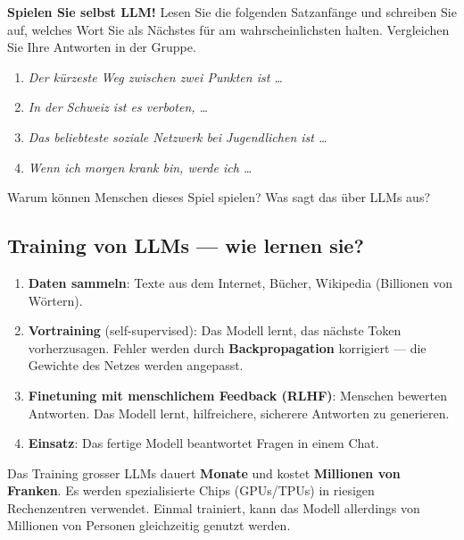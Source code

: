 \begin{myexercise}
\textbf{Spielen Sie selbst LLM!} Lesen Sie die folgenden Satzanfänge und schreiben
Sie auf, welches Wort Sie als Nächstes für am wahrscheinlichsten halten.
Vergleichen Sie Ihre Antworten in der Gruppe.

\begin{enumerate}
    \item \textit{Der kürzeste Weg zwischen zwei Punkten ist \ldots}
    \item \textit{In der Schweiz ist es verboten, \ldots}
    \item \textit{Das beliebteste soziale Netzwerk bei Jugendlichen ist \ldots}
    \item \textit{Wenn ich morgen krank bin, werde ich \ldots}
\end{enumerate}

Warum können Menschen dieses Spiel spielen? Was sagt das über LLMs aus?
\end{myexercise}

\subsection{Training von LLMs --- wie lernen sie?}

\begin{myprocedure}
\begin{enumerate}
    \item \textbf{Daten sammeln}: Texte aus dem Internet, Bücher, Wikipedia
          (Billionen von Wörtern).
    \item \textbf{Vortraining} (self-supervised): Das Modell lernt, das nächste
          Token vorherzusagen. Fehler werden durch \textbf{Backpropagation}
          korrigiert --- die Gewichte des Netzes werden angepasst.
    \item \textbf{Finetuning mit menschlichem Feedback (RLHF)}: Menschen bewerten
          Antworten. Das Modell lernt, hilfreichere, sicherere Antworten zu generieren.
    \item \textbf{Einsatz}: Das fertige Modell beantwortet Fragen in einem Chat.
\end{enumerate}
\end{myprocedure}

\begin{myremark}
Das Training grosser LLMs dauert \textbf{Monate} und kostet \textbf{Millionen von
Franken}. Es werden spezialisierte Chips (GPUs/TPUs) in riesigen Rechenzentren
verwendet. Einmal trainiert, kann das Modell allerdings von Millionen von Personen
gleichzeitig genutzt werden.
\end{myremark}

